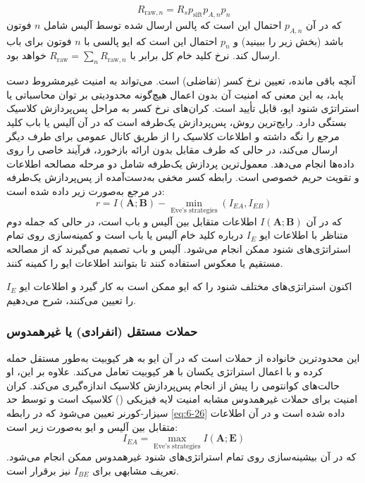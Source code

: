 \begin{equation}
	R_{\text{raw},n} = R_s p_{\text{sift}} p_{A,n} p_n
	\label{eq:6-25}
\end{equation}
که در آن $p_{A,n}$ احتمال این است که پالس ارسال شده توسط آلیس شامل $n$ فوتون باشد (بخش زیر را ببینید) و $p_n$ احتمال این است که ایو پالسی با $n$ فوتون برای باب ارسال کند. نرخ کلید خام کل برابر با $R_{\text{raw}} = \sum_n R_{\text{raw},n}$ خواهد بود.

آنچه باقی مانده، تعیین نرخ کسر (تفاضلی) است.  می‌تواند به امنیت غیرمشروط دست یابد، به این معنی که امنیت آن بدون اعمال هیچ‌گونه محدودیتی بر توان محاسباتی یا استراتژی شنود ایو، قابل تأیید است. کران‌های نرخ کسر به مراحل پس‌پردازش کلاسیک بستگی دارد. رایج‌ترین روش، پس‌پردازش یک‌طرفه است که در آن آلیس یا باب کلید مرجع را نگه داشته و اطلاعات کلاسیک را از طریق کانال عمومی برای طرف دیگر ارسال می‌کند، در حالی که طرف مقابل بدون ارائه بازخورد، فرآیند خاصی را روی داده‌ها انجام می‌دهد. معمول‌ترین پردازش یک‌طرفه شامل دو مرحله مصالحه اطلاعات و تقویت حریم خصوصی است. رابطه کسر مخفی به‌دست‌آمده از پس‌پردازش یک‌طرفه در مرجع \cite{48} به‌صورت زیر داده شده است:
\begin{equation}
	r = I(\bm{A}; \bm{B}) - \min_{\text{Eve's strategies}} (I_{EA}, I_{EB})
	\label{eq:6-26}
\end{equation}
که در آن $I(\bm{A}; \bm{B})$ اطلاعات متقابل بین آلیس و باب است، در حالی که جمله دوم متناظر با اطلاعات ایو $I_E$ درباره کلید خام آلیس یا باب است و کمینه‌سازی روی تمام استراتژی‌های شنود ممکن انجام می‌شود. آلیس و باب تصمیم می‌گیرند که از مصالحه مستقیم یا معکوس استفاده کنند تا بتوانند اطلاعات ایو را کمینه کنند.

اکنون استراتژی‌های مختلف شنود را که ایو ممکن است به کار گیرد و اطلاعات ایو $I_E$ را تعیین می‌کنند، شرح می‌دهیم.

\subsubsection{حملات مستقل (انفرادی) یا غیرهمدوس}
\label{subsec:6-5-1}
این محدودترین خانواده از حملات است که در آن ایو به هر کیوبیت به‌طور مستقل حمله کرده و با اعمال استراتژی یکسان با هر کیوبیت تعامل می‌کند. علاوه بر این، او حالت‌های کوانتومی را پیش از انجام پس‌پردازش کلاسیک اندازه‌گیری می‌کند. کران امنیت برای حملات غیرهمدوس مشابه امنیت لایه فیزیکی () کلاسیک \cite{2} است و توسط حد سیزار-کورنر \cite{50} تعیین می‌شود که در رابطه \eqref{eq:6-26} داده شده است و در آن اطلاعات متقابل بین آلیس و ایو به‌صورت زیر است:
\begin{equation}
	I_{EA} = \max_{\text{Eve's strategies}} I(\bm{A}; \bm{E})
	\label{eq:6-27}
\end{equation}
که در آن بیشینه‌سازی روی تمام استراتژی‌های شنود غیرهمدوس ممکن انجام می‌شود. تعریف مشابهی برای $I_{BE}$ نیز برقرار است.

